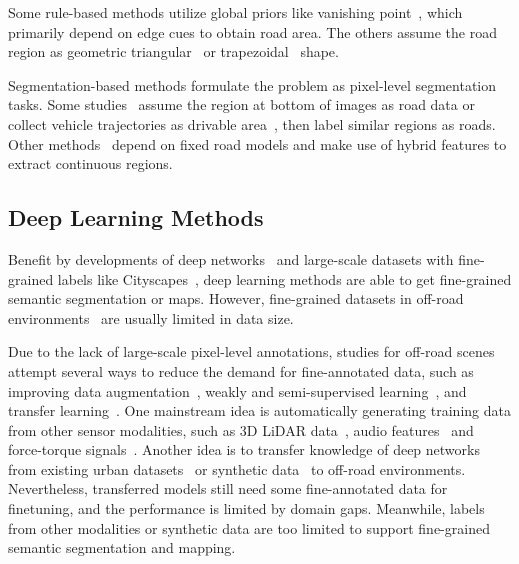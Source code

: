 \documentclass[letterpaper, 10 pt, conference]{ieeeconf}  %
\begin{document}
	Some rule-based methods utilize global priors like vanishing point~\cite{kong2009vanishing}\cite{shi2015fast}, which primarily depend on edge cues to obtain road area. The others assume the road region as geometric triangular~\cite{zhou2010self} or trapezoidal~\cite{jeong2002vision} shape.
	
	Segmentation-based methods formulate the problem as pixel-level segmentation tasks. Some studies~\cite{lu2014hierarchical}
	assume the region at bottom of images as road data or collect vehicle trajectories as drivable area~\cite{mei2017scene}, then label similar regions as roads.
	Other methods~\cite{alon2006off}\cite{wang2009unstructured} depend on fixed road models and make use of hybrid features to extract continuous regions.
	
	\subsection{Deep Learning Methods}
	Benefit by developments of deep networks~\cite{long2015fully} and large-scale datasets with fine-grained labels like Cityscapes~\cite{cordts2016cityscapes}, deep learning methods are able to get fine-grained semantic segmentation or maps. However, fine-grained datasets in off-road environments~\cite{valada2016deep} are usually limited in data size.
	
	Due to the lack of large-scale pixel-level annotations, studies for off-road scenes attempt several ways to reduce the demand for fine-annotated data, such as improving data augmentation~\cite{valada2016towards}, weakly and semi-supervised learning~\cite{suger2015traversability}\cite{gao2019off}, and transfer learning~\cite{holder2016road}\cite{sharma2019semantic}. 
	One mainstream idea is automatically generating training data from other sensor modalities, such as 3D LiDAR data~\cite{gao2019off}\cite{tang2017one}, audio features~\cite{zurn2020self} and force-torque signals~\cite{wellhausen2019should}.
	Another idea is to transfer knowledge of deep networks from existing urban datasets~\cite{holder2016road} or synthetic data~\cite{sharma2019semantic} to off-road environments.
	Nevertheless, transferred models still need some fine-annotated data for finetuning, and the performance is limited by domain gaps. Meanwhile, labels from other modalities or synthetic data are too limited to support fine-grained semantic segmentation and mapping.
	
\end{document}
